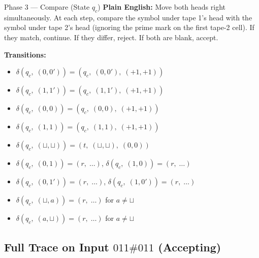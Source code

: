 \begin{definitionbox}{Phase 3 --- Compare (State $q_c$)}
\textbf{Plain English:} Move both heads right simultaneously. At each step, compare the symbol under tape 1's head with the symbol under tape 2's head (ignoring the prime mark on the first tape-2 cell). If they match, continue. If they differ, reject. If both are blank, accept.

\textbf{Transitions:}
\begin{itemize}[nosep]
\item $\delta(q_c,\;(0, 0')) = (q_c,\;(0, 0'),\;(+1, +1))$ 
\item $\delta(q_c,\;(1, 1')) = (q_c,\;(1, 1'),\;(+1, +1))$ 
\item $\delta(q_c,\;(0, 0)) = (q_c,\;(0, 0),\;(+1, +1))$ 
\item $\delta(q_c,\;(1, 1)) = (q_c,\;(1, 1),\;(+1, +1))$ 
\item $\delta(q_c,\;(\sqcup, \sqcup)) = (t,\;(\sqcup, \sqcup),\;(0, 0))$ 
\item $\delta(q_c,\;(0, 1)) = (r,\;\ldots)$, \;$\delta(q_c,\;(1, 0)) = (r,\;\ldots)$ 
\item $\delta(q_c,\;(0, 1')) = (r,\;\ldots)$, \;$\delta(q_c,\;(1, 0')) = (r,\;\ldots)$ 
\item $\delta(q_c,\;(\sqcup, a)) = (r,\;\ldots)$ for $a \neq \sqcup$ 
\item $\delta(q_c,\;(a, \sqcup)) = (r,\;\ldots)$ for $a \neq \sqcup$ 
\end{itemize}
\end{definitionbox}


\subsection{Full Trace on Input $011\#011$ (Accepting)}

